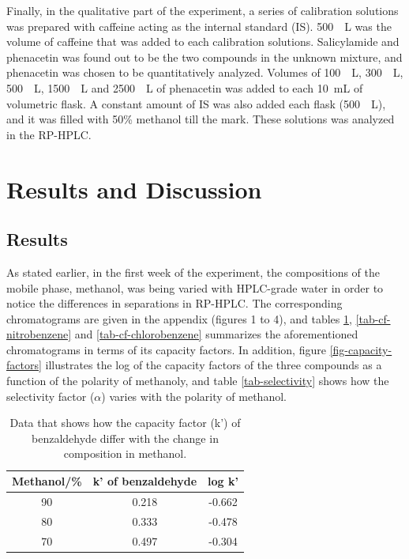\documentclass[a4paper, 12pt]{article}
\begin{document}
Finally, in the qualitative part of the experiment, a series of calibration solutions was prepared with caffeine acting as the internal standard (IS). \SI{500}{\mu{}L} was the volume of caffeine that was added to each calibration solutions. Salicylamide and phenacetin was found out to be the two compounds in the unknown mixture, and phenacetin was chosen to be quantitatively analyzed. Volumes of \SI{100}{\mu{}L}, \SI{300}{\mu{}L}, \SI{500}{\mu{}L}, \SI{1500}{\mu{}L} and \SI{2500}{\mu{}L} of phenacetin was added to each \SI{10}{mL} of volumetric flask. A constant amount of IS was also added each flask (\SI{500}{\mu{}L}), and it was filled with 50\% methanol till the mark. These solutions was analyzed in the RP-HPLC.


\section{Results and Discussion}

\subsection{Results}
As stated earlier, in the first week of the experiment, the compositions of the mobile phase, methanol, was being varied with HPLC-grade water in order to notice the differences in separations in RP-HPLC. The corresponding chromatograms are given in the appendix (figures 1 to 4), and tables \ref{tab-cf-benzaldehyde}, \ref{tab-cf-nitrobenzene} and \ref{tab-cf-chlorobenzene} summarizes the aforementioned chromatograms in terms of its capacity factors. In addition, figure \ref{fig-capacity-factors} illustrates the log of the capacity factors of the three compounds as a function of the polarity of methanoly, and table \ref{tab-selectivity} shows how the selectivity factor ($\alpha$) varies with the polarity of methanol.

\begin{table}[h!]
	\centering
	\caption{Data that shows how the capacity factor (k') of benzaldehyde differ with the change in composition in methanol.}
	\begin{tabular}{|c|c|c|}
		\hline
		Methanol/\% & k' of benzaldehyde & log k' \\
		\hline
		90 & 0.218 & -0.662 \\
		\hline
		80 & 0.333 & -0.478 \\
		\hline
		70 & 0.497 & -0.304 \\
		\hline
	\end{tabular}
	\label{tab-cf-benzaldehyde}
\end{table}
\end{document}
